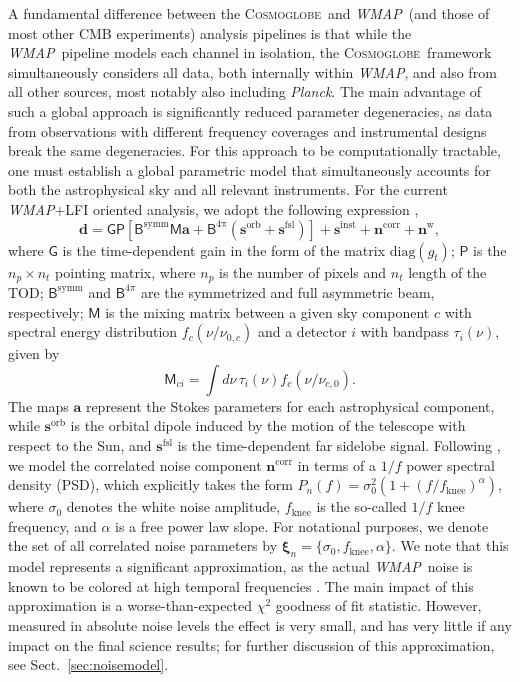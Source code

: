 \documentclass[twocolumn]{../../common/aa}
\def\WMAP{\emph{WMAP}}
\def\Planck{\emph{Planck}}
\newcommand{\cosmoglobe}{\textsc{Cosmoglobe}}
\begin{document}
A fundamental difference between the \cosmoglobe\ and \WMAP\ (and those of most other CMB experiments) analysis pipelines is that while the \WMAP\ pipeline models each channel in isolation, the \cosmoglobe\ framework simultaneously considers all data, both internally within \WMAP, and also from all other sources, most notably also including \Planck. The main advantage of such a global approach is significantly reduced parameter degeneracies, as data from observations with different frequency coverages and instrumental designs break the same degeneracies. For this approach to be computationally tractable, one must establish a global parametric model that simultaneously accounts for both the astrophysical sky and all relevant instruments. For the current \WMAP+LFI oriented analysis, we adopt the following expression \citep{bp01},
\begin{equation}
	\label{eq:model}
	\boldsymbol d =\mathsf G\mathsf P[\mathsf B^\mathrm{symm}\mathsf M\boldsymbol a+\mathsf B^\mathrm{4\pi}(\boldsymbol s^\mathrm{orb}
	+\boldsymbol s^\mathrm{fsl})] + \boldsymbol s^\mathrm{inst}+ \boldsymbol n^\mathrm{corr}+\boldsymbol n^\mathrm w,
\end{equation}
where $\mathsf G$ is the time-dependent gain in the form of the matrix $\mathrm{diag}(g_t)$; $\mathsf P$ is the $n_p\times n_t$ pointing matrix, where $n_p$ is the number of pixels and $n_t$ length of the TOD;
$\mathsf B^\mathrm{symm}$ and $\mathsf B^{4\pi}$ are the symmetrized and full asymmetric beam, respectively; $\mathsf M$ is the mixing matrix between a given sky component $c$ with spectral energy distribution $f_c(\nu/\nu_{0,c})$ and a detector $i$ with bandpass $\tau_i(\nu)$, given by
\begin{equation}
	\mathsf M_{ci}=\int d\nu\,\tau_i(\nu)f_c(\nu/\nu_{c,0}).
\end{equation}
The maps $\boldsymbol a$ represent the Stokes parameters for each astrophysical component, while $\boldsymbol s^\mathrm{orb}$ is the orbital dipole induced by the motion of the telescope with respect to the Sun, and $\boldsymbol s^\mathrm{fsl}$ is the time-dependent far sidelobe signal. Following \citet{bp06}, we model the correlated noise component $\boldsymbol n^\mathrm{corr}$ in terms of a $1/f$ power spectral density (PSD), which explicitly takes the form $P_n(f) = \sigma^2_0 (1 + (f/f_\mathrm{knee})^\alpha)$, where $\sigma_0$ denotes the white noise amplitude, $f_\mathrm{knee}$ is the so-called $1/f$ knee frequency, and $\alpha$ is a free power law slope. For notational purposes, we denote the set of all correlated noise parameters by $\boldsymbol\xi_n = \{\sigma_0, f_{\mathrm{knee}}, \alpha\}$. We note that this model represents a significant approximation, as the actual \WMAP\ noise is known to be colored  at high temporal frequencies \citep{jarosik2007}. The main impact of this approximation is a worse-than-expected $\chi^2$ goodness of fit statistic. However, measured in absolute noise levels the effect is very small, and has very little if any impact on the final science results; for further discussion of this approximation, see Sect.~\ref{sec:noisemodel}. 
\end{document}
